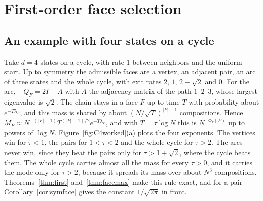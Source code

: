 \section{First-order face selection}\label{sec:firstorder}

\subsection{An example with four states on a cycle}\label{sec:worked}

Take $d=4$ states on a cycle, with rate $1$ between neighbors and the uniform
start. Up to symmetry the admissible faces are a vertex, an adjacent pair, an
arc of three states and the whole cycle, with exit rates $2$, $1$, $2-\sqrt2$
and $0$. For the arc, $-Q_F=2I-A$ with $A$ the adjacency matrix of the path
$1$--$2$--$3$, whose largest eigenvalue is $\sqrt2$. The chain stays in a face $F$
up to time $T$ with probability about $e^{-T\lambda_F}$, and this mass is shared
by about $(N/\sqrt T)^{|F|-1}$ compositions. Hence
$M_F\approx N^{-(|F|-1)}T^{(|F|-1)/2}e^{-T\lambda_F}$, and with $T=\tau\log N$
this is $N^{-\Phi_\tau(F)}$ up to powers of $\log N$.
Figure~\ref{fig:C4worked}(a) plots the four exponents. The vertices win for
$\tau<1$, the pairs for $1<\tau<2$ and the whole cycle for $\tau>2$. The arcs
never win, since they beat the pairs only for $\tau>1+\sqrt2$, where the
cycle beats them. The whole cycle carries almost all the mass for every
$\tau>0$, and it carries the mode only for $\tau>2$, because it spreads its
mass over about $N^3$ compositions. Theorems~\ref{thm:first}
and~\ref{thm:facemax} make this rule exact, and for a pair
Corollary~\ref{cor:symface} gives the constant $1/\sqrt{2\pi}$ in front.

